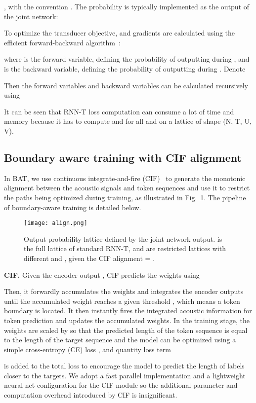 \documentclass{INTERSPEECH2023}
\begin{document}
, with the convention . The probability  is typically implemented as the output of the joint network:


To optimize the transducer objective,  and gradients are calculated using the efficient forward-backward algorithm~\cite{rnn-t}:


where  is the forward variable, defining the probability
of outputting  during , and  is the backward variable, defining the probability of outputting  during .  Denote


Then the forward variables and backward variables can be calculated recursively using

It can be seen that RNN-T loss computation can consume a lot of time and memory because it has to compute  and  for all  and  on a lattice of shape (N, T, U, V). 

\subsection{Boundary aware training with CIF alignment}
\label{sec:cif}
In BAT, we use continuous integrate-and-fire (CIF)~\cite{cif}  to generate the monotonic alignment between the acoustic signals and token sequences and use it to restrict the paths being optimized during training, as illustrated in Fig.~\ref{fig:ali}. The pipeline of boundary-aware training is detailed below.
\begin{figure}[!ht]
  \centering
  \texttt{[image: align.png]}
  \caption{Output probability lattice defined by the joint network output.  is the full lattice of standard RNN-T, and  are restricted lattices with different  and , given the CIF alignment    = . }
  \label{fig:ali}
\end{figure}

\textbf{CIF.} Given the encoder output , CIF predicts the weights  using

Then, it forwardly accumulates the weights and integrates the encoder outputs until the accumulated weight reaches a given threshold , which means a token boundary is located.  It then instantly fires the integrated acoustic information for token prediction and updates the accumulated weights.  
In the training stage, the weights  are scaled by  so that the predicted length of the token sequence is equal to the length of the target sequence and the model can be optimized using a simple cross-entropy (CE) loss , and quantity loss term 

is added to the total loss to encourage the model to predict the length of labels closer to the targets. We adopt a fast parallel implementation and a lightweight neural net configuration for the CIF module so the additional parameter and computation overhead introduced by CIF is insignificant.
\end{document}
